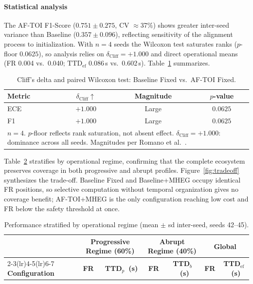 \documentclass[a4paper,fleqn]{cas-dc}
\newcommand{\AFTOI}{\mbox{AF-TOI}\xspace}
\begin{document}
\paragraph{Statistical analysis}
The \AFTOI F1-Score ($0.751 \pm 0.275$, CV $\approx$37\%) shows greater
inter-seed variance than Baseline ($0.357 \pm 0.096$), reflecting sensitivity of
the alignment process to initialization. With $n=4$ seeds the Wilcoxon test
saturates ranks ($p$-floor $0.0625$), so analysis relies on
$\delta_{\mathrm{Cliff}} = +1.000$ and direct operational means (FR 0.004 vs.\
0.040; $\mathrm{TTD}_{\mathrm{ef}}$ 0.086\,s vs.\ 0.602\,s).
Table~\ref{tab:cliff_delta} summarizes.
\begin{table}[!tbp]
\centering
\caption{Cliff's delta and paired Wilcoxon test: Baseline Fixed vs.\ \mbox{AF-TOI} Fixed.}
\label{tab:cliff_delta}
\footnotesize
\setlength{\tabcolsep}{5pt}
\renewcommand{\arraystretch}{1.15}
\begin{tabular}{l c c c}
\toprule
\textbf{Metric} & \textbf{$\delta_{\mathrm{Cliff}}$}$\uparrow$
  & \textbf{Magnitude} & \textbf{$p$-value} \\
\midrule
ECE & $+1.000$ & Large & $0.0625$ \\
F1  & $+1.000$ & Large & $0.0625$ \\
\bottomrule
\multicolumn{4}{p{0.94\columnwidth}}{\footnotesize $n=4$. $p$-floor
reflects rank saturation, not absent effect.
$\delta_{\mathrm{Cliff}}=+1.000$: dominance across all seeds.
Magnitudes per Romano et al.~\cite{romano2006appropriate}.}
\end{tabular}
\end{table}
Table~\ref{tab:estratificado} stratifies by operational regime, confirming that the complete ecosystem preserves coverage in both progressive and abrupt profiles. Figure~\ref{fig:tradeoff} synthesizes the trade-off. Baseline Fixed and Baseline+MHEG occupy identical FR positions, so selective computation without temporal organization gives no coverage benefit; \mbox{AF-TOI}+MHEG is the only configuration reaching low cost and FR below the safety threshold at once.
\begin{table}[!tbp]
\centering
\caption{Performance stratified by operational regime
(mean $\pm$ sd inter-seed, seeds 42--45).}
\label{tab:estratificado}
\footnotesize
\setlength{\tabcolsep}{5pt}
\renewcommand{\arraystretch}{1.22}
\begin{tabular}{l cc cc cc}
\toprule
& \multicolumn{2}{c}{\textbf{Progressive Regime (60\%)}}
& \multicolumn{2}{c}{\textbf{Abrupt Regime (40\%)}}
& \multicolumn{2}{c}{\textbf{Global}} \\
\cmidrule(lr){2-3}\cmidrule(lr){4-5}\cmidrule(lr){6-7}
\textbf{Configuration}
  & \textbf{FR} & \textbf{TTD$_{p}$~(s)}
  & \textbf{FR} & \textbf{TTD$_b$~(s)}
  & \textbf{FR} & \textbf{TTD$_{\mathrm{ef}}$~(s)} \\
\midrule

\end{tabular}
\end{table}
\end{document}
